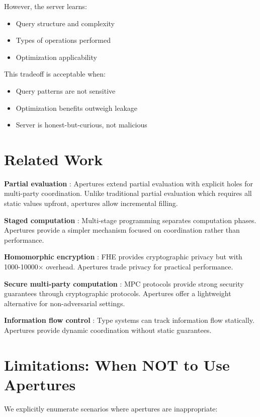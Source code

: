 \documentclass[10pt]{article}
\begin{document}
However, the server learns:
\begin{itemize}
\item Query structure and complexity
\item Types of operations performed
\item Optimization applicability
\end{itemize}

This tradeoff is acceptable when:
\begin{itemize}
\item Query patterns are not sensitive
\item Optimization benefits outweigh leakage
\item Server is honest-but-curious, not malicious
\end{itemize}

\section{Related Work}

\textbf{Partial evaluation} \cite{jones1993partial}: Apertures extend partial evaluation with explicit holes for multi-party coordination. Unlike traditional partial evaluation which requires all static values upfront, apertures allow incremental filling.

\textbf{Staged computation} \cite{taha1997multi}: Multi-stage programming separates computation phases. Apertures provide a simpler mechanism focused on coordination rather than performance.

\textbf{Homomorphic encryption} \cite{gentry2009fully}: FHE provides cryptographic privacy but with 1000-10000× overhead. Apertures trade privacy for practical performance.

\textbf{Secure multi-party computation} \cite{yao1982protocols}: MPC protocols provide strong security guarantees through cryptographic protocols. Apertures offer a lightweight alternative for non-adversarial settings.

\textbf{Information flow control} \cite{sabelfeld2003language}: Type systems can track information flow statically. Apertures provide dynamic coordination without static guarantees.

\section{Limitations: When NOT to Use Apertures}

We explicitly enumerate scenarios where apertures are inappropriate:
\end{document}
